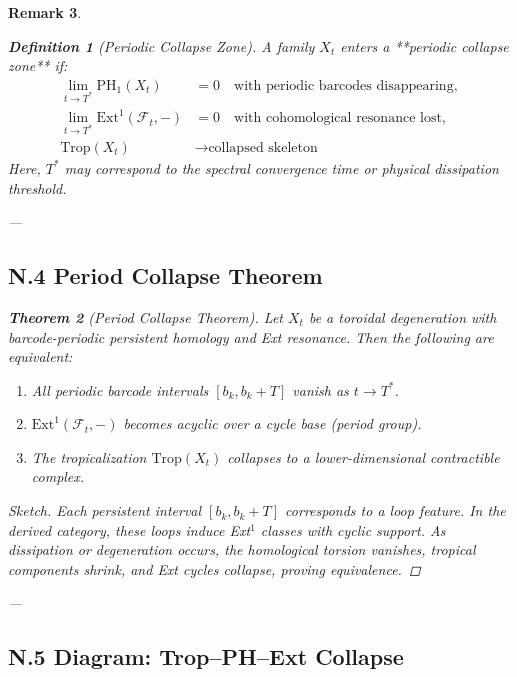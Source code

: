 \documentclass[11pt]{article}
\newtheorem{theorem}{Theorem}[section]
\newtheorem{definition}[theorem]{Definition}
\newtheorem{remark}[theorem]{Remark}
\begin{document}
\begin{remark}
\begin{definition}[Periodic Collapse Zone]
A family $X_t$ enters a **periodic collapse zone** if:
\begin{align*}
\lim_{t \to T^*} \mathrm{PH}_1(X_t) &= 0 \quad \text{with periodic barcodes disappearing}, \\
\lim_{t \to T^*} \mathrm{Ext}^1(\mathcal{F}_t, -) &= 0 \quad \text{with cohomological resonance lost}, \\
\mathrm{Trop}(X_t) &\to \text{collapsed skeleton}
\end{align*}
Here, $T^*$ may correspond to the spectral convergence time or physical dissipation threshold.
\end{definition}

---

\subsection*{N.4 Period Collapse Theorem}

\begin{theorem}[Period Collapse Theorem]
Let $X_t$ be a toroidal degeneration with barcode-periodic persistent homology and Ext resonance. Then the following are equivalent:
\begin{enumerate}
  \item All periodic barcode intervals $[b_k, b_k+T]$ vanish as $t \to T^*$.
  \item $\mathrm{Ext}^1(\mathcal{F}_t, -)$ becomes acyclic over a cycle base (period group).
  \item The tropicalization $\mathrm{Trop}(X_t)$ collapses to a lower-dimensional contractible complex.
\end{enumerate}
\end{theorem}

\begin{proof}[Sketch]
Each persistent interval $[b_k, b_k + T]$ corresponds to a loop feature.  
In the derived category, these loops induce Ext$^1$ classes with cyclic support.  
As dissipation or degeneration occurs, the homological torsion vanishes, tropical components shrink, and Ext cycles collapse, proving equivalence.
\end{proof}

---

\subsection*{N.5 Diagram: Trop–PH–Ext Collapse}


\end{remark}
\end{document}
